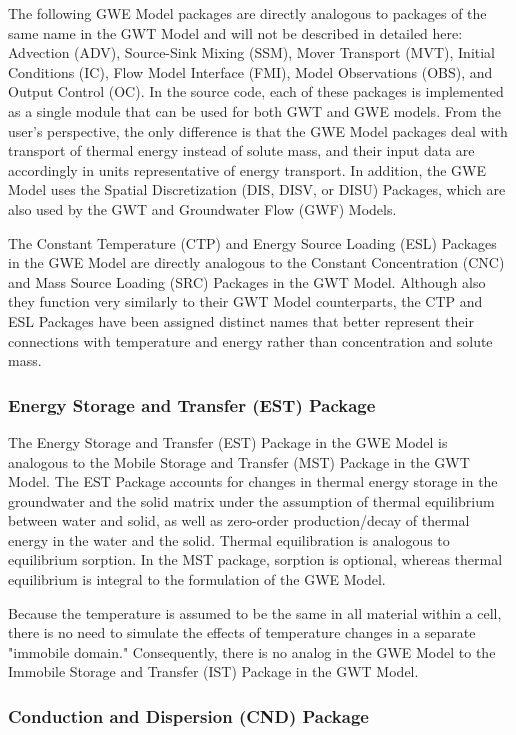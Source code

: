 The following GWE Model packages are directly analogous to packages of the same name in the GWT Model and will not be described in detailed here: Advection (ADV), Source-Sink Mixing (SSM), Mover Transport (MVT), Initial Conditions (IC), Flow Model Interface (FMI), Model Observations (OBS), and Output Control (OC). In the \mf source code, each of these packages is implemented as a single module that can be used for both GWT and GWE models. From the user's perspective, the only difference is that the GWE Model packages deal with transport of thermal energy instead of solute mass, and their input data are accordingly in units representative of energy transport. In addition, the GWE Model uses the Spatial Discretization (DIS, DISV, or DISU) Packages, which are also used by the GWT and Groundwater Flow (GWF) Models.

The Constant Temperature (CTP) and Energy Source Loading (ESL) Packages in the GWE Model are directly analogous to the Constant Concentration (CNC) and Mass Source Loading (SRC) Packages in the GWT Model. Although also they function very similarly to their GWT Model counterparts, the CTP and ESL Packages have been assigned distinct names that better represent their connections with temperature and energy rather than concentration and solute mass.

\subsubsection{Energy Storage and Transfer (EST) Package}

The Energy Storage and Transfer (EST) Package in the GWE Model is analogous to the Mobile Storage and Transfer (MST) Package in the GWT Model. The EST Package accounts for changes in thermal energy storage in the groundwater and the solid matrix under the assumption of thermal equilibrium between water and solid, as well as zero-order production/decay of thermal energy in the water and the solid. Thermal equilibration is analogous to equilibrium sorption. In the MST package, sorption is optional, whereas thermal equilibrium is integral to the formulation of the GWE Model.

Because the temperature is assumed to be the same in all material within a cell, there is no need to simulate the effects of temperature changes in a separate "immobile domain." Consequently, there is no analog in the GWE Model to the Immobile Storage and Transfer (IST) Package in the GWT Model.

\subsubsection{Conduction and Dispersion (CND) Package}

